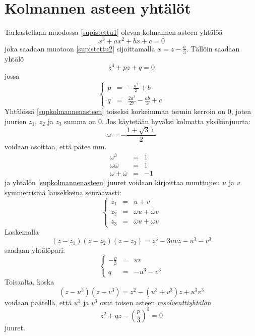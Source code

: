 \documentclass[a4paper]{article}
\begin{document}
\section{Kolmannen asteen yhtälöt}
Tarkastellaan muodossa \ref{supistettu1} olevaa kolmannen asteen yhtälöä
$$
x^3+ax^2+bx+c=0
$$
joka saadaan muotoon \ref{supistettu2} sijoittamalla $x=z-\frac{a}{3}$. Tällöin saadaan yhtälö
\begin{equation}
\label{supkolmannenasteen}
z^3+pz+q=0
\end{equation}
jossa
$$
\left\{
\begin{array}{ccc}
  p & = & -\frac{a^2}{3}+b \\
  q & = & \frac{2a^3}{27}-\frac{ab}{3}+c
\end{array}
\right.
$$
Yhtälössä \ref{supkolmannenasteen} toiseksi korkeimman termin kerroin on 0, joten juurien $z_1$, $z_2$ ja $z_3$ summa on 0. Jos käytetään hyväksi kolmatta yksikönjuurta:
$$
\omega=-\frac{1+\sqrt{3}\hat\imath}{2}
$$
voidaan osoittaa, että pätee mm.
\begin{eqnarray*}
  \omega^3 & = & 1 \\
  \omega\overline{\omega} & = & 1 \\
  \omega+\overline{\omega} & = & -1
\end{eqnarray*}
ja yhtälön \ref{supkolmannenasteen} juuret voidaan kirjoittaa muuttujien $u$ ja $v$ symmetrisinä lausekkeina seuraavasti:
\begin{equation}
  \label{kolmjuuret}
\left\{
\begin{array}{ccc}
  z_1 & = & u+v \\
  z_2 & = & \omega u+\overline{\omega} v \\
  z_3 & = & \overline{\omega} u+\omega v
\end{array}
\right.
\end{equation}
Laskemalla
$$
(z-z_1)(z-z_2)(z-z_3)=z^3-3uvz-u^3-v^3
$$
saadaan yhtälöpari:
$$
\left\{
\begin{array}{ccc}
  -\frac{p}{3} & = & uv \\
  q & = & -u^3-v^3
\end{array}
\right.
$$
Toisaalta, koska
$$
(z-u^3)(z-v^3)=z^2-(u^3+v^3)z+u^3 v^3
$$
voidaan päätellä, että $u^3$ ja $v^3$ ovat toisen asteen \emph{resolventtiyhtälön}
\begin{equation}
  \label{kolmresolventti}
z^2+qz-\left(\frac{p}{3}\right)^3=0
\end{equation}
juuret.
\end{document}
